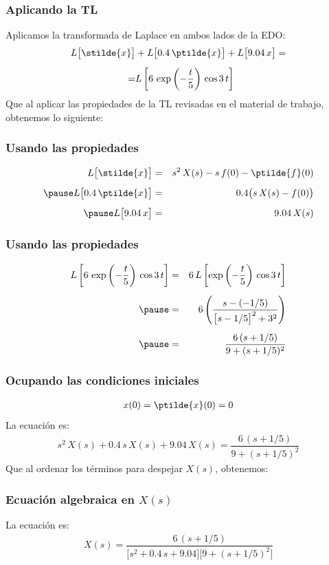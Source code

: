 \begin{frame}
\frametitle{Aplicando la TL}
Aplicamos la transformada de Laplace en ambos lados de la EDO:
\begin{align*}
L \big[\stilde{x}\big] &+ L\big[0.4 \, \ptilde{x}\big] + L \big[9.04 \, x\big] = \\[0.5em]
=& L \left[ 6 \, \exp \left( -\dfrac{t}{5}\right) \, \cos 3 \, t \right]
\end{align*}
\pause
Que al aplicar las propiedades de la TL revisadas en el material de trabajo, obtenemos lo siguiente:
\end{frame}
\begin{frame}
\frametitle{Usando las propiedades}
\begin{eqnarray*}
L \big[\stilde{x}\big] &=& s^{2} \, X(s) - s \, f(0) - \ptilde{f}(0) \\[0.5em] \pause
L \big[0.4 \, \ptilde{x}\big] &=& 0. 4 \big( s \, X(s) - f(0)\big) \\[0.5em] \pause
L \big[9.04 \, x\big] &=& 9.04 \, X(s)
\end{eqnarray*}
\end{frame}
\begin{frame}
\frametitle{Usando las propiedades}
\begin{eqnarray*}
L \left[ 6 \, \exp \left( -\dfrac{t}{5}\right) \, \cos 3 \, t \right] &=& 6 \, L \left[\exp \left( -\dfrac{t}{5}\right) \, \cos 3 \, t \right] \\[0.5em] \pause
&=& 6 \left( \dfrac{s - (-1/5)}{\big[s - 1/5\big]^{2} + 3^{2}} \right) \\[0.5em] \pause
&=& \dfrac{6 \, (s + 1/5)}{9 + (s + 1/5)^{2}}
\end{eqnarray*}
\end{frame}
\begin{frame}
\frametitle{Ocupando las condiciones iniciales}
\begin{align*}
x(0) = \ptilde{x}(0) = 0
\end{align*}
\pause
La ecuación es:
\begin{align*}
s^{2} \, X(s) + 0.4 \, s \, X(s) + 9.04 \, X(s) = \dfrac{6 \, (s + 1/5)}{9 + (s + 1/5)^{2}}
\end{align*}
\pause
Que al ordenar los términos para despejar $X(s)$, obtenemos:
\end{frame}
\begin{frame}
\frametitle{Ecuación algebraica en $X(s)$}
La ecuación es:
\begin{align*}
X(s) = \dfrac{6 \, (s + 1/5)}{\big[s^{2} + 0.4 \, s + 9.04\big] \big[9 + (s + 1/5)^{2}\big]}
\end{align*}
\end{frame}
